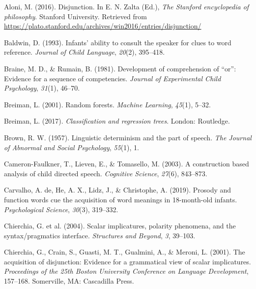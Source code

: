 \documentclass[
  ,man,floatsintext]{apa6}
\newlength{\cslhangindent}
\newlength{\cslentryspacingunit} %
\newenvironment{CSLReferences}[2] %
 {%
  \setlength{\parindent}{0pt}
  \ifodd #1
  \let\oldpar\par
  \def\par{\hangindent=\cslhangindent\oldpar}
  \fi
  \setlength{\parskip}{#2\cslentryspacingunit}
 }%
 {}
\begin{document}
\setlength{\parindent}{-0.5in}
\setlength{\leftskip}{0.5in}

\hypertarget{refs}{}
\begin{CSLReferences}{1}{0}
\leavevmode{}%
Aloni, M. (2016). Disjunction. In E. N. Zalta (Ed.), \emph{The {S}tanford encyclopedia of philosophy}. Stanford University. Retrieved from \url{https://plato.stanford.edu/archives/win2016/entries/disjunction/}

\leavevmode{}%
Baldwin, D. (1993). Infants' ability to consult the speaker for clues to word reference. \emph{Journal of Child Language}, \emph{20}(2), 395--418.

\leavevmode{}%
Braine, M. D., \& Rumain, B. (1981). Development of comprehension of {``or''}: Evidence for a sequence of competencies. \emph{Journal of Experimental Child Psychology}, \emph{31}(1), 46--70.

\leavevmode{}%
Breiman, L. (2001). Random forests. \emph{Machine Learning}, \emph{45}(1), 5--32.

\leavevmode{}%
Breiman, L. (2017). \emph{Classification and regression trees}. London: Routledge.

\leavevmode{}%
Brown, R. W. (1957). Linguistic determinism and the part of speech. \emph{The Journal of Abnormal and Social Psychology}, \emph{55}(1), 1.

\leavevmode{}%
Cameron-Faulkner, T., Lieven, E., \& Tomasello, M. (2003). A construction based analysis of child directed speech. \emph{Cognitive Science}, \emph{27}(6), 843--873.

\leavevmode{}%
Carvalho, A. de, He, A. X., Lidz, J., \& Christophe, A. (2019). Prosody and function words cue the acquisition of word meanings in 18-month-old infants. \emph{Psychological Science}, \emph{30}(3), 319--332.

\leavevmode{}%
Chierchia, G. et al. (2004). Scalar implicatures, polarity phenomena, and the syntax/pragmatics interface. \emph{Structures and Beyond}, \emph{3}, 39--103.

\leavevmode{}%
Chierchia, G., Crain, S., Guasti, M. T., Gualmini, A., \& Meroni, L. (2001). The acquisition of disjunction: Evidence for a grammatical view of scalar implicatures. \emph{Proceedings of the 25th {B}oston {U}niversity Conference on Language Development}, 157--168. Somerville, MA: Cascadilla Press.


\end{CSLReferences}
\end{document}
